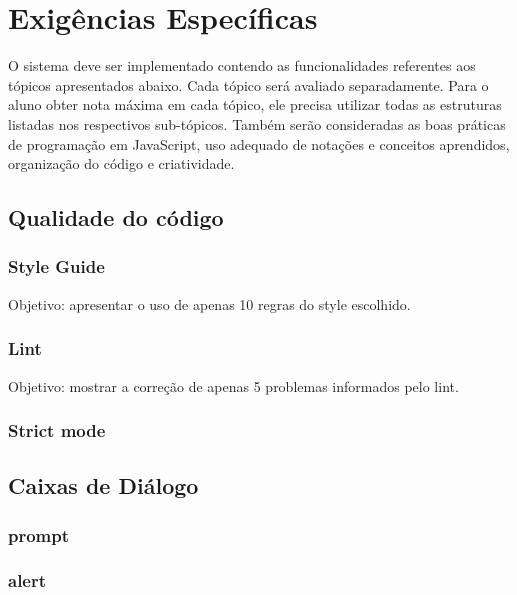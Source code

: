 \chapter{Exigências Específicas}
	O sistema deve ser implementado contendo as funcionalidades referentes aos tópicos apresentados abaixo. Cada tópico será avaliado separadamente. Para o aluno obter nota máxima em cada tópico, ele precisa utilizar todas as estruturas listadas nos respectivos sub-tópicos. Também serão consideradas as boas práticas de programação em JavaScript, uso adequado de notações e conceitos aprendidos, organização do código e criatividade.

\section{Qualidade do código}


\subsection{Style Guide}
	Objetivo: apresentar o uso de apenas 10 regras do style escolhido.

\subsection{Lint}
	Objetivo: mostrar a correção de apenas 5 problemas informados pelo lint.

\subsection{Strict mode}
	


\section{Caixas de Diálogo}

\subsection{prompt}

\subsection{alert}

